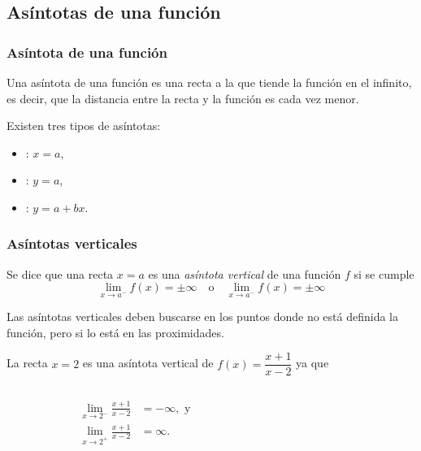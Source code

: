 	
	
	\subsection{Asíntotas de una función}
	\begin{frame}
		\frametitle{Asíntota de una función}
		Una asíntota de una función es una recta a la que tiende la función en el infinito, es decir, que la distancia entre la recta y la función es cada vez menor.
		
		Existen tres tipos de asíntotas:
		\begin{itemize}
			\item {}: $x=a$,
			\item {}: $y=a$,
			\item {}: $y=a+bx$.
		\end{itemize}
	\end{frame}
	
	
	\begin{frame}
		\frametitle{Asíntotas verticales}
		\begin{definicion}
			Se dice que una recta $x=a$ es una \emph{asíntota vertical} de una función $f$ si se cumple
			\[ \lim_{x\rightarrow a^-}f(x)=\pm \infty \quad \textrm{o} \quad \lim_{x\rightarrow a^-}f(x)=\pm \infty \]
		\end{definicion}
		
		Las asíntotas verticales deben buscarse en los puntos donde no está definida la función, pero si lo está en las proximidades.
		
		 La recta $x=2$ es una asíntota vertical de $f(x)=\dfrac{x+1}{x-2}$ ya que
		\begin{columns}
			\begin{column}{0.3\textwidth}
				\begin{align*}
					\lim_{x\rightarrow 2^-}\frac{x+1}{x-2} & =-\infty, \textrm{ y} \\
					\lim_{x\rightarrow 2^+}\frac{x+1}{x-2} & =\infty.              
				\end{align*}
			\end{column}
			\begin{column}{0.4\textwidth}
				\begin{center}
					\scalebox{1}{}
				\end{center}
			\end{column}
		\end{columns}
	\end{frame}
	
